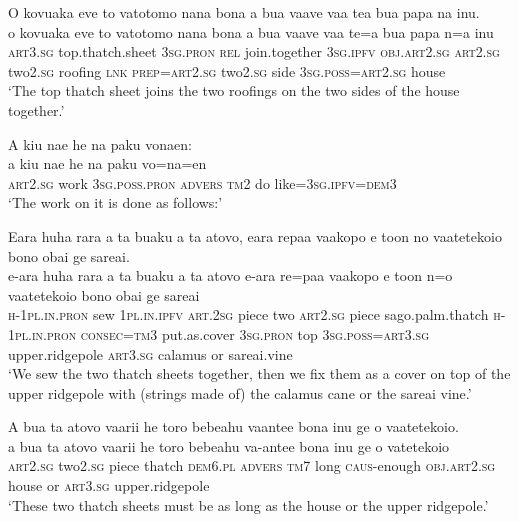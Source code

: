 \ea\label{ex:text13-1}
O kovuaka eve to vatotomo nana bona a bua vaave vaa tea bua papa na inu.\\
\gll o	kovuaka	eve	to	vatotomo	nana	bona	a	bua	vaave	vaa	te=a	bua	papa	n=a	inu\\
     \textsc{art}3.\textsc{sg}	top.thatch.sheet	3\textsc{sg}.\textsc{pron}	\textsc{rel}	join.together	3\textsc{sg}.\textsc{ipfv}	\textsc{obj}.\textsc{art}2.\textsc{sg}	\textsc{art}2.\textsc{sg}	two2.\textsc{sg}	roofing	\textsc{lnk}	\textsc{prep}=\textsc{art}2.\textsc{sg}	two2.\textsc{sg}	side	3\textsc{sg}.\textsc{poss}=\textsc{art}2.\textsc{sg}	house\\
\glt `The top thatch sheet joins the two roofings on the two sides of the house together.'
\z

\ea\label{ex:text13-2}
A kiu nae he na paku vonaen:\\
\gll a	kiu	nae	he	na	paku	vo=na=en\\
     \textsc{art}2.\textsc{sg}	work	3\textsc{sg}.\textsc{poss}.\textsc{pron}	\textsc{advers}	\textsc{tm}2	do	like=3\textsc{sg}.\textsc{ipfv}=\textsc{dem}3\\
\glt `The work on it is done as follows:'
\z

\ea\label{ex:text13-3}
Eara huha rara a ta buaku a ta atovo, eara repaa vaakopo e toon no vaatetekoio bono obai ge sareai.\\
\gll e-ara	huha	rara	a	ta	buaku	a	ta	atovo	e-ara	re=paa	vaakopo	e	toon	n=o	vaatetekoio	bono	obai	ge	sareai\\
     \textsc{h}-1\textsc{pl}.\textsc{in}.\textsc{pron}	sew	1\textsc{pl}.\textsc{in}.\textsc{ipfv}	\textsc{art}.2\textsc{sg}	piece	two	\textsc{art}2.\textsc{sg}	piece	sago.palm.thatch	\textsc{h}-1\textsc{pl}.\textsc{in}.\textsc{pron}	\textsc{consec}=\textsc{tm}3	put.as.cover	3\textsc{sg}.\textsc{pron}	top	3\textsc{sg}.\textsc{poss}=\textsc{art}3.\textsc{sg}	upper.ridgepole	\textsc{art}3.\textsc{sg}	calamus	or	sareai.vine\\
\glt `We sew the two thatch sheets together, then we fix them as a cover on top of the upper ridgepole with (strings made of) the calamus cane or the sareai vine.'
\z

\ea\label{ex:text13-4}
A bua ta atovo vaarii he toro bebeahu vaantee bona inu ge o vaatetekoio.\\
\gll a	bua	ta	atovo	vaarii	he	toro	bebeahu	va-antee	bona	inu	ge	o	vatetekoio\\
     \textsc{art}2.\textsc{sg}	two2.\textsc{sg}	piece	thatch	\textsc{dem}6.\textsc{pl}	\textsc{advers}	\textsc{tm}7	long	\textsc{caus}-enough	\textsc{obj}.\textsc{art}2.\textsc{sg}	house	or	\textsc{art}3.\textsc{sg}	upper.ridgepole\\
\glt `These two thatch sheets must be as long as the house or the upper ridgepole.'
\z


